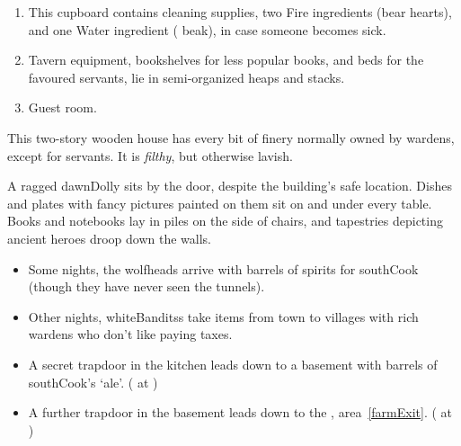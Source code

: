 \begin{multicols}{2}
\begin{enumerate}
  A map on the wall shows all of \gls{valley}.
  Show your players the map in the handouts, but don't give it to them unless the \glspl{pc} want to steal the map.
  \item
  \label{horseCupboard}
  This cupboard contains cleaning supplies, two Fire \glspl{ingredient} (bear hearts), and one Water \gls{ingredient} ( beak), in case someone becomes sick.
  \item
  \label{horseSideRoom}
  Tavern equipment, bookshelves for less popular books, and beds for the favoured servants, lie in semi-organized heaps and stacks.
  \item
  \label{wolfRoom}
  Guest room.
\end{enumerate}


This two-story wooden house has every bit of finery normally owned by \glspl{warden}, except for servants.
It is \emph{filthy}, but otherwise lavish.

\begin{boxtext}
  A ragged \gls{dawnDolly} sits by the door, despite the building's safe location.
  Dishes and plates with fancy pictures painted on them sit on and under every table.
  Books and notebooks lay in piles on the side of chairs, and tapestries depicting ancient heroes droop down the walls.
\end{boxtext}

\begin{itemize}
  \item
  Some nights, the \glspl{wolfhead} arrive with barrels of spirits for \gls{southCook} (though they have never seen the tunnels).%
  \item
  Other nights, \glspl{whiteBandits} take items from \gls{town} to \glspl{village} with rich \glspl{warden} who don't like paying taxes.
  \item
  A secret trapdoor in the kitchen leads down to a basement with barrels of \gls{southCook}'s `ale'.
  ( at \tn[10])
  \item
  A further trapdoor in the basement leads down to the , \gls{area}~\vref{farmExit}.
  ( at \tn[10])
\end{itemize}

\null



\end{multicols}
